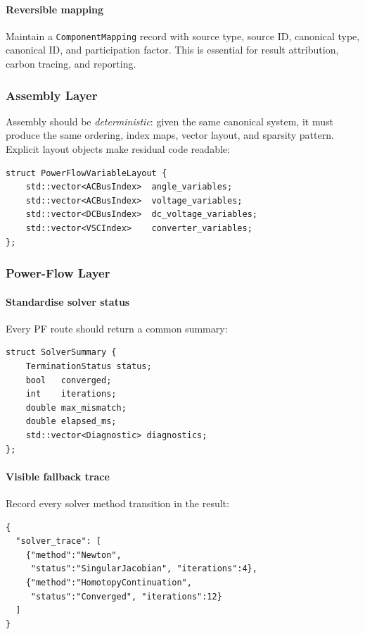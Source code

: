 \paragraph{Reversible mapping}
Maintain a \texttt{ComponentMapping} record with source type, source ID,
canonical type, canonical ID, and participation factor.  This is essential
for result attribution, carbon tracing, and reporting.

\subsubsection{Assembly Layer}

Assembly should be \emph{deterministic}: given the same canonical system,
it must produce the same ordering, index maps, vector layout, and sparsity
pattern.  Explicit layout objects make residual code readable:

\begin{verbatim}
struct PowerFlowVariableLayout {
    std::vector<ACBusIndex>  angle_variables;
    std::vector<ACBusIndex>  voltage_variables;
    std::vector<DCBusIndex>  dc_voltage_variables;
    std::vector<VSCIndex>    converter_variables;
};
\end{verbatim}

\subsubsection{Power-Flow Layer}

\paragraph{Standardise solver status}
Every PF route should return a common summary:
\begin{verbatim}
struct SolverSummary {
    TerminationStatus status;
    bool   converged;
    int    iterations;
    double max_mismatch;
    double elapsed_ms;
    std::vector<Diagnostic> diagnostics;
};
\end{verbatim}

\paragraph{Visible fallback trace}
Record every solver method transition in the result:
\begin{verbatim}
{
  "solver_trace": [
    {"method":"Newton",
     "status":"SingularJacobian", "iterations":4},
    {"method":"HomotopyContinuation",
     "status":"Converged", "iterations":12}
  ]
}
\end{verbatim}

